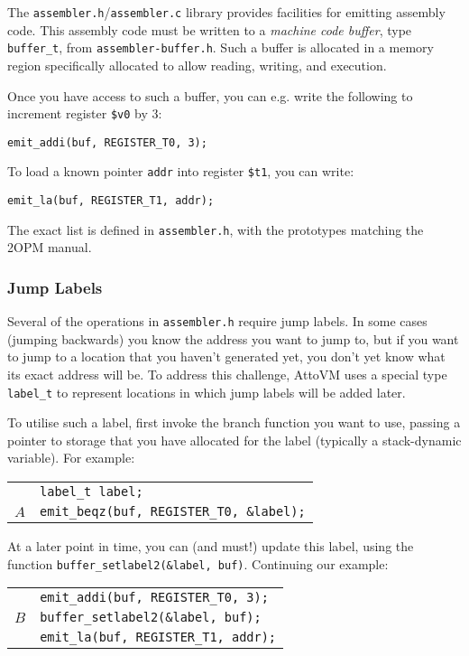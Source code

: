 \documentclass[11pt,a4paper]{article}
\newcommand{\Cty}[1]{\textcolor{dblue}{\texttt{#1}}}
\begin{document}
The \texttt{assembler.h}/\texttt{assembler.c} library provides
facilities for emitting assembly code.  This assembly code must be
written to a \emph{machine code buffer}, type \Cty{buffer\_t}, from
\texttt{assembler-buffer.h}.  Such a buffer is allocated in a memory region specifically
allocated to allow reading, writing, and execution.

Once you have access to such a buffer, you can e.g. write the following to increment
 register  \texttt{\$v0} by $3$:

\texttt{emit\_addi(buf, REGISTER\_T0, 3);}

To load a known pointer \texttt{addr} into  register \texttt{\$t1}, you can write:

\texttt{emit\_la(buf, REGISTER\_T1, addr);}

The exact list is defined in \texttt{assembler.h}, with the prototypes
matching the 2OPM manual.

\subsubsection{Jump Labels}
Several of the operations in \texttt{assembler.h} require jump labels.
In some cases (jumping backwards) you know the address you want to
jump to, but if you want to jump to a location that you haven't generated yet,
you don't yet know what its exact address will be.  To address this challenge,
AttoVM uses a special type \Cty{label\_t} to represent locations in which jump labels will be added later.

To utilise such a label, first invoke the branch function you want to use, passing a pointer to
storage that you have allocated for the label (typically a stack-dynamic variable).  For example:

\vspace{0.5cm}
\begin{tabular}{ll}
&\texttt{\Cty{label\_t} label;}\\
$A$&\texttt{emit\_beqz(buf, REGISTER\_T0, \&label);}\\
\end{tabular}
\vspace{0.5cm}

At a later point in time, you can (and must!) update this label, using
the function \texttt{buffer\_setlabel2(\&label, buf)}.  Continuing our example:

\vspace{0.5cm}

\begin{tabular}{ll}
&\texttt{emit\_addi(buf, REGISTER\_T0, 3);} \\
$B$&\texttt{buffer\_setlabel2(\&label, buf);} \\
&\texttt{emit\_la(buf, REGISTER\_T1, addr);} \\
\end{tabular}
\end{document}
